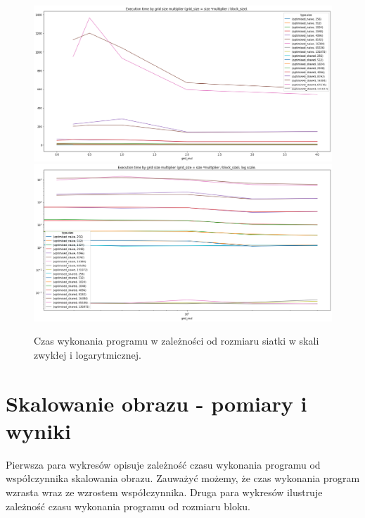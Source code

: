 \documentclass{article}
\begin{document}
        \begin{figure}[htb]
            \centering
            \includegraphics[width=\textwidth]{cuda/Lab2/report/images/matrix_trans_by_grid_mul.png}
            \includegraphics[width=\textwidth]{cuda/Lab2/report/images/matrix_trans_by_grid_mul_log.png}
            \caption{Czas wykonania programu w zależności od rozmiaru siatki w skali zwykłej i logarytmicznej.}
        \end{figure}

        
    \section{Skalowanie obrazu - pomiary i wyniki}
        Pierwsza para wykresów opisuje zależność czasu wykonania programu od współczynnika skalowania obrazu. Zauważyć możemy, że czas wykonania program wzrasta  wraz ze wzrostem współczynnika. Druga para wykresów ilustruje zależność czasu wykonania programu od rozmiaru bloku.
    
\end{document}
